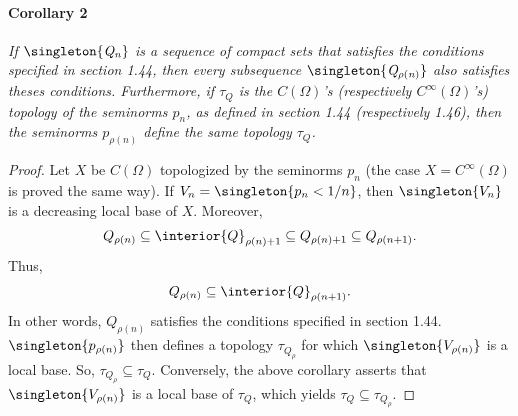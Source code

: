 \paragraph{Corollary 2}{\it %
If 
%
  $\mathit{\mathit{\singleton{Q_n}}}$ 
%
is a sequence of compact sets that satisfies the conditions specified 
in section 1.44, then every subsequence 
%
  $\mathit{\singleton{Q_{\rho(n)}}}$ 
%
also satisfies theses conditions.
%
Furthermore, if $\mathit{\tau_{Q}}$ is the $\mathit{C(\Omega)}$'s 
(respectively $\mathit{C^\infty (\Omega)}$'s) topology of the seminorms %
$\mathit{p_{n}}$, 
as defined in section 1.44 (respectively 1.46), then the seminorms 
%
  $\mathit{p_{\rho(n)}}$ 
%
define the same topology $\mathit{\tau_{Q}}$. %
}
%
\begin{proof}%
%
Let $X$ be $C(\Omega)$ topologized by the seminorms $p_{n}$ 
(the case $X=C^\infty(\Omega)$ is proved the same way).
%
If 
    $V_{n} = \singleton{p_{n} < 1/n}$, 
then 
    $\singleton{V_{n}}$ 
is a decreasing local base of $X$.
%
Moreover,
% 
  \begin{align}
    Q_{\rho(n)} 
      \subseteq 
    \interior{Q}_{\rho(n) + 1} 
      \subseteq 
    Q_{\rho(n) + 1} 
      \subseteq 
    Q_{\rho(n+ 1)}.
  \end{align}
% 
Thus,
%
  \begin{align}
    Q_{\rho(n)} 
      \subseteq 
    \interior{Q}_{\rho(n+ 1)}.
  \end{align}
%
In other words, 
%
  $Q_{\rho(n)}$ satisfies the conditions specified in section 1.44.
%
%
  $\singleton{p_{\rho(n)}}$
% 
then defines a topology $\tau_{Q_\rho}$ for which  
% 
  $\singleton{V_{\rho(n)}}$ 
%
is a local base. So, 
% 
  $\tau_{Q_\rho} \subseteq \tau_{Q}$.
%
Conversely, the above corollary asserts that 
%
  $\singleton{V_{\rho(n)}}$ 
%
is a local base of $\tau_{Q}$, which yields  
%
  $\tau_{Q}\subseteq \tau_{Q_\rho}$.
%
\end{proof}
